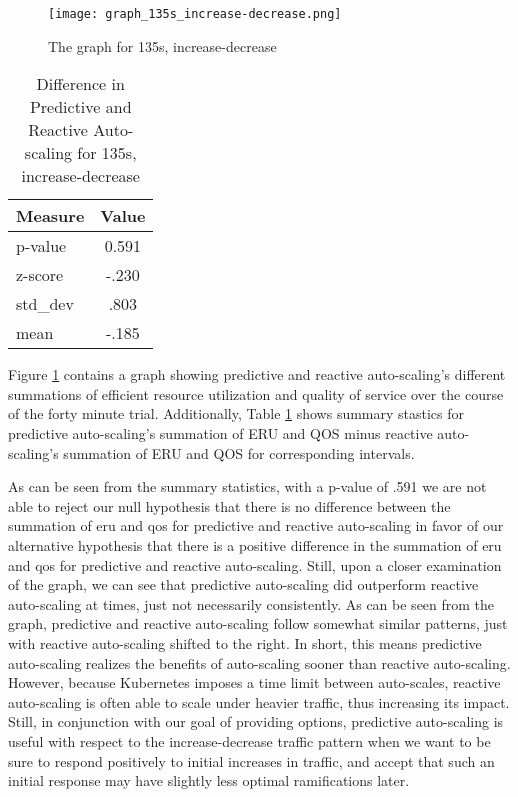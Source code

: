\begin{figure}[!h]
  \centerline{\texttt{[image: graph\_135s\_increase-decrease.png]}}
  \caption{The graph for 135s, increase-decrease}
  \label{fig:135s-increase-decrease}
\end{figure}

\begin{table}[htbp]
  \centering
  \caption{Difference in Predictive and Reactive Auto-scaling for 135s, increase-decrease}
  \label{tab:135s-increase-decrease}
\begin{tabular}{l c}\hline\hline
    \multicolumn{1}{c}{\textbf{Measure}} & \textbf{Value} \\ \hline
     p-value & 0.591 \\
     z-score & -.230 \\
     std\_dev & .803 \\
     mean & -.185
  \end{tabular}
\end{table}

Figure \ref{fig:135s-increase-decrease} contains a graph
showing predictive and reactive auto-scaling's different
summations of efficient resource utilization and quality of service over the
course of the forty minute trial. Additionally, Table
\ref{tab:135s-increase-decrease} shows summary stastics for predictive
auto-scaling's summation of ERU and QOS minus reactive auto-scaling's summation
of ERU and QOS for corresponding intervals.

As can be seen from the summary statistics, with a p-value of .591 we are not
able to reject our null hypothesis that there is no difference between the
summation of eru and qos for predictive and reactive auto-scaling in favor of
our alternative hypothesis that there is a positive difference in the summation
of eru and qos for predictive and reactive auto-scaling. Still, upon a closer
examination of the graph, we can see that predictive auto-scaling did outperform
reactive auto-scaling at times, just not necessarily consistently. As can be
seen from the graph, predictive and reactive auto-scaling follow somewhat
similar patterns, just with reactive auto-scaling shifted to the right. In
short, this means predictive auto-scaling realizes the benefits of auto-scaling
sooner than reactive auto-scaling. However, because Kubernetes imposes a time
limit between auto-scales, reactive auto-scaling is often able to scale under
heavier traffic, thus increasing its impact. Still, in conjunction with our goal
of providing options, predictive auto-scaling is useful with respect to
the increase-decrease traffic pattern when we want to be sure to respond
positively to initial increases in traffic, and accept that such an initial
response may have slightly less optimal ramifications later.
